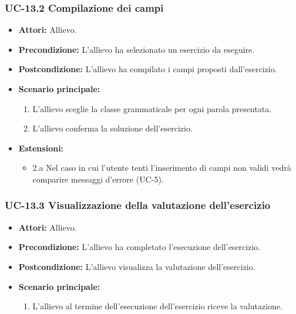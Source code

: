	\subsubsection{UC-13.2 Compilazione dei campi}
		\begin{itemize}
			\item \textbf{Attori:} Allievo.
			\item \textbf{Precondizione:} L'allievo ha selezionato un esercizio da eseguire.
			\item \textbf{Postcondizione:} L'allievo ha compilato i campi proposti dall'esercizio.
			\item \textbf{Scenario principale:}
				\begin{enumerate}
					\item L'allievo sceglie la classe grammaticale per ogni parola presentata.
					\item L'allievo conferma la soluzione dell'esercizio.
				\end{enumerate}
			\item \textbf{Estensioni:} 
				\begin{itemize}
					\item 2.a Nel caso in cui l'utente tenti l'inserimento di campi non validi vedrà comparire messaggi d'errore (UC-5).
				\end{itemize}
		\end{itemize}

	\subsubsection{UC-13.3 Visualizzazione della valutazione dell'esercizio}
	\begin{itemize}
			\item \textbf{Attori:} Allievo.
			\item \textbf{Precondizione:} L'allievo ha completato l'esecuzione dell'esercizio.
			\item \textbf{Postcondizione:} L'allievo visualizza la valutazione dell'esercizio.
			\item \textbf{Scenario principale:}
				\begin{enumerate}
					\item L'allievo al termine dell'esecuzione dell'esercizio riceve la valutazione.
				\end{enumerate}
			\end{itemize}
			
